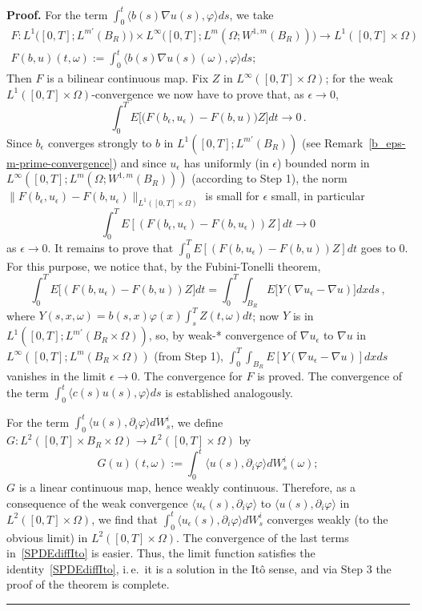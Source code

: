 \documentclass[a4paper,10pt]{article}
\newenvironment{proof}[1][Proof]{\noindent\textbf{#1.} }{\ \rule{0.5em}{0.5em}}
\newcommand{\lan}{\langle}
\newcommand{\ran}{\rangle}
\newcommand{\eps}{\epsilon}
\begin{document}
\begin{proof}
For the term $\int^t_0 \lan b(s)\nabla u(s), \varphi \ran ds$, we take 
\begin{gather*}
F \colon L^1\big([0,T];L^{m'}(B_R) \big) \times L^\infty \big([0,T]; L^m(\Omega;W^{1,m}(B_R))\big) \rightarrow L^1([0,T]\times\Omega) \\
F(b,u)(t,\omega) := \int^t_0 \lan b(s)\nabla u(s)(\omega), \varphi \ran ds;
\end{gather*}
Then $F$ is a bilinear continuous map. Fix $Z$ in $L^\infty([0,T]\times\Omega)$; for the weak $L^1([0,T]\times\Omega)$-convergence we now have to prove that, as $\eps\rightarrow0$,
\begin{equation*}
\int^T_0E \big[ \big(F(b_\eps,u_\eps)-F(b,u) \big) Z \big]dt\rightarrow 0 \, .
\end{equation*}
Since $b_\eps$ converges strongly to $b$ in $L^1([0,T];L^{m'}(B_R))$ (see Remark~\ref{b_eps-m-prime-convergence}) and since $u_\eps$ has uniformly (in $\eps$) bounded norm in $L^\infty([0,T];L^m(\Omega;W^{1,m}(B_R)))$ (according to Step 1), the norm $\|F(b_\eps,u_\eps)-F(b,u_\eps)\|_{L^1([0,T]\times\Omega)}$ is small for $\eps$ small, in particular 
\begin{equation*}
\int^T_0E[(F(b_\eps,u_\eps)-F(b,u_\eps))Z]dt \rightarrow 0
\end{equation*}
as $\eps \rightarrow 0$. It remains to prove that $\int^T_0E[(F(b,u_\eps)-F(b,u))Z]dt$ goes to $0$. For this purpose, we notice that, by the Fubini-Tonelli theorem,
\begin{equation*}
\int^T_0 E \big[ (F(b,u_\eps)-F(b,u))Z \big] dt=\int^T_0\int_{B_R}E \big[Y (\nabla u_\eps - \nabla u) \big]dxds \, ,
\end{equation*}
where $Y(s,x,\omega)=b(s,x)\varphi(x)\int^T_s Z(t,\omega)dt$; now $Y$ is in $L^1([0,T];L^{m'}(B_R\times\Omega))$, so, by weak-* convergence of $\nabla u_\eps$ to $\nabla u$ in $L^\infty([0,T];L^m(B_R \times \Omega))$ (from Step 1), $\int^T_0\int_{B_R}E[Y (\nabla u_\eps- \nabla u)] dxds$ vanishes in the limit $\eps \rightarrow 0$. The convergence for $F$ is proved. The convergence of the term $\int^t_0 \lan c(s) u(s), \varphi \ran ds$ is established analogously.

For the term $\int^t_0\lan u(s),\partial_i\varphi\ran dW^i_s$, we define $G \colon L^2([0,T]\times B_R\times\Omega)\rightarrow L^2([0,T]\times\Omega)$ by
\begin{equation*}
G(u)(t,\omega):=\int^t_0\lan u(s),\partial_i\varphi\ran dW^i_s(\omega);
\end{equation*}
$G$ is a linear continuous map, hence weakly continuous. Therefore, as a consequence of the weak convergence $\lan u_\eps (s),\partial_i\varphi\ran$ to $\lan u (s),\partial_i\varphi\ran$ in $L^2([0,T]\times\Omega)$, we find that $\int^t_0\lan u_\eps (s),\partial_i\varphi\ran dW^i_s$ converges weakly (to the obvious limit) in $L^2([0,T]\times\Omega)$. The convergence of the last terms in~\eqref{SPDEdiffIto} is easier. Thus, the limit function satisfies the identity~\eqref{SPDEdiffIto}, i.\,e.\ it is a solution in the It\^o sense, and via Step 3 the proof of the theorem is complete.
\end{proof}
\end{document}
